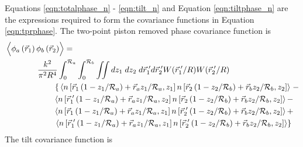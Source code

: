 Equations \ref{eqn:totalphase_n} - \ref{eqn:tilt_n} and Equation
\ref{eqn:tiltphase_n} are the expressions required to form the covariance
functions in Equation \ref{eqn:tprphase}.  The two-point piston removed phase
covariance function is
\begin{equation}\label{eqn:prphase_n}
\begin{aligned}
&\left\langle \vphantom{\hat{\phi}_{a}} \phi_{a}\left(\vec{r}_{1}\right) \phi_{b}\left(\vec{r}_{2}\right)\right\rangle = \\
&\quad\quad\quad\quad
\frac{k^{2}}{\pi^{2}R^{4}} \int_{0}^{\mathcal{R}_{a}}  \int_{0}^{\mathcal{R}_{b}} \iint dz_{1} \; dz_{2} \; d\vec{r}^{\;\prime}_{1}d\vec{r}^{\;\prime}_{2} W(\vec{r}^{\;\prime}_{1}/R) W(\vec{r}^{\;\prime}_{2}/R) \\
&\quad\quad\quad\quad\quad\quad
\left\{\vphantom{\vec{r}^{\;\prime}_{1}}
\left\langle n\left[\vec{r}_{1}\left(1-z_{1}/\mathcal{R}_{a}\right) + \vec{r}_{a} z_{1}/\mathcal{R}_{a}, z_{1}\right]
 n\left[\vec{r}_{2}\left(1-z_{2}/\mathcal{R}_{b}\right) + \vec{r}_{b} z_{2}/\mathcal{R}_{b}, z_{2}\right] \right\rangle\right. -
\\
&\quad\quad\quad\quad\quad\quad
\left\langle n\left[\vec{r}^{\;\prime}_{1}\left(1-z_{1}/\mathcal{R}_{a}\right) + \vec{r}_{a} z_{1}/\mathcal{R}_{a}, z_{2}\right]
 n\left[\vec{r}_{2}\left(1-z_{2}/\mathcal{R}_{b}\right) + \vec{r}_{b} z_{2}/\mathcal{R}_{b}, z_{2}\right] \right\rangle -
\\
&\quad\quad\quad\quad\quad\quad
\left\langle n\left[\vec{r}_{1}\left(1-z_{1}/\mathcal{R}_{a}\right) + \vec{r}_{a} z_{1}/\mathcal{R}_{a}, z_{1}\right]
 n\left[\vec{r}^{\;\prime}_{2}\left(1-z_{2}/\mathcal{R}_{b}\right) + \vec{r}_{b} z_{2}/\mathcal{R}_{b}, z_{2}\right] \right\rangle +
\\
&\quad\quad\quad\quad\quad\quad
\left.
\left\langle n\left[\vec{r}^{\;\prime}_{1}\left(1-z_{1}/\mathcal{R}_{a}\right) + \vec{r}_{a} z_{1}/\mathcal{R}_{a}, z_{1}\right]
 n\left[\vec{r}^{\;\prime}_{2}\left(1-z_{2}/\mathcal{R}_{b}\right) + \vec{r}_{b} z_{2}/\mathcal{R}_{b}, z_{2}\right] \right\rangle
\right\}
\end{aligned}
\end{equation}
The tilt covariance function is

